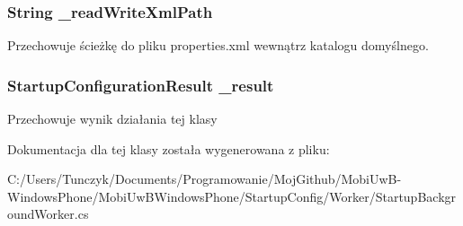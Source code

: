 \subsubsection[{\+\_\+read\+Write\+Xml\+Path}]{\setlength{\rightskip}{0pt plus 5cm}String \+\_\+read\+Write\+Xml\+Path\hspace{0.3cm}{\ttfamily [private]}}\label{a00060_a8e495187f4a4af24518af257690ff869}


Przechowuje ścieżkę do pliku properties.\+xml wewnątrz katalogu domyślnego. 

\hypertarget{a00060_ac180fa8e53675d26aca81db486d66744}{}
\subsubsection[{\+\_\+result}]{\setlength{\rightskip}{0pt plus 5cm}Startup\+Configuration\+Result \+\_\+result\hspace{0.3cm}{\ttfamily [private]}}\label{a00060_ac180fa8e53675d26aca81db486d66744}


Przechowuje wynik działania tej klasy 



Dokumentacja dla tej klasy została wygenerowana z pliku\+:\begin{DoxyCompactItemize}
\item 
C\+:/\+Users/\+Tunczyk/\+Documents/\+Programowanie/\+Moj\+Github/\+Mobi\+Uw\+B-\/\+Windows\+Phone/\+Mobi\+Uw\+B\+Windows\+Phone/\+Startup\+Config/\+Worker/Startup\+Background\+Worker.\+cs\end{DoxyCompactItemize}
